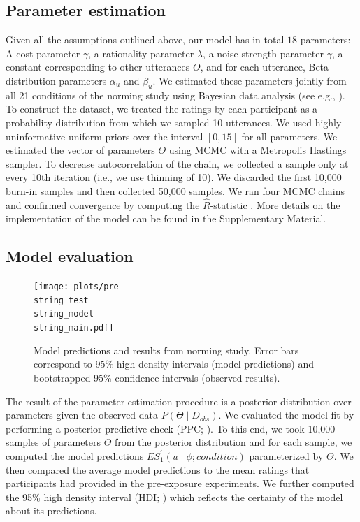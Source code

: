\documentclass[lucida,biblatex]{sp} %
\begin{document}
\subsection{Parameter estimation}

Given all the assumptions outlined above, our model has in total $18$ parameters: A cost parameter $\gamma$, a rationality parameter $\lambda$, a noise strength parameter $\gamma$, a constant corresponding to other utterances $O$, and for each utterance, Beta distribution parameters $\alpha_u$ and $\beta_u$. We estimated these parameters jointly from all 21 conditions of the norming study using Bayesian data analysis (see e.g., \cite{Kruschke2014}). To construct the dataset, we treated the ratings by each participant as a probability distribution from which we sampled 10 utterances. We used highly uninformative
uniform priors over the interval $[0,15]$ for all parameters. We estimated the vector of parameters $\Theta$ using MCMC with a Metropolis Hastings sampler. To decrease autocorrelation of the chain, we collected a sample only at every 10th iteration (i.e., we use thinning of 10). We discarded the first 10,000 burn-in samples and then collected 50,000 samples.  We ran four MCMC chains and confirmed convergence by computing the $\hat{R}$-statistic \citep{Gelman1992}. More details on the implementation of the model can be found in the Supplementary Material.

\subsection{Model evaluation}



\begin{figure}
\texttt{[image: plots/pre\\string\_test\\string\_model\\string\_main.pdf]}
\caption{Model predictions and results from norming study. Error bars correspond to 95\% high density intervals (model predictions) and bootstrapped 95\%-confidence intervals (observed results). \label{fig:norming-results-model-main}}

\end{figure}


The result of the parameter estimation procedure is a posterior distribution over parameters given the observed data $P(\Theta \mid D_{obs})$. We evaluated
the model fit by performing a posterior predictive check (PPC; \cite{Kruschke2014}). To this end, we took 10,000 samples of parameters $\Theta$ from the posterior distribution
and for each sample, we computed the model predictions $ES_{1}^'(u \mid \phi; condition)$ parameterized by $\Theta$. We then compared the average model predictions to the
mean ratings that participants had provided in the pre-exposure experiments. We further computed the 95\% high density interval (HDI; \cite{Kruschke2014}) which reflects the certainty of the model
about its predictions.
\end{document}

